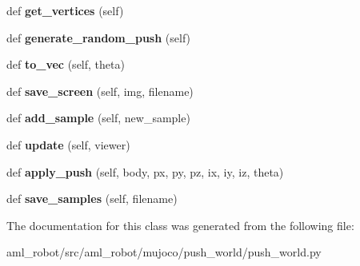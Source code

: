 \begin{DoxyCompactItemize}
\item 
\hypertarget{classaml__robot_1_1mujoco_1_1push__world_1_1push__world_1_1_push_world_a9d1907c397604e25f01a72e91374a715}{}\label{classaml__robot_1_1mujoco_1_1push__world_1_1push__world_1_1_push_world_a9d1907c397604e25f01a72e91374a715} 
def {\bfseries get\+\_\+vertices} (self)
\item 
\hypertarget{classaml__robot_1_1mujoco_1_1push__world_1_1push__world_1_1_push_world_a453d33c0a1a8067c683d747e87e995ab}{}\label{classaml__robot_1_1mujoco_1_1push__world_1_1push__world_1_1_push_world_a453d33c0a1a8067c683d747e87e995ab} 
def {\bfseries generate\+\_\+random\+\_\+push} (self)
\item 
\hypertarget{classaml__robot_1_1mujoco_1_1push__world_1_1push__world_1_1_push_world_aff175795ad0dc158872167fdc5af7859}{}\label{classaml__robot_1_1mujoco_1_1push__world_1_1push__world_1_1_push_world_aff175795ad0dc158872167fdc5af7859} 
def {\bfseries to\+\_\+vec} (self, theta)
\item 
\hypertarget{classaml__robot_1_1mujoco_1_1push__world_1_1push__world_1_1_push_world_a37092dc3946f924987fcdf69c3407cab}{}\label{classaml__robot_1_1mujoco_1_1push__world_1_1push__world_1_1_push_world_a37092dc3946f924987fcdf69c3407cab} 
def {\bfseries save\+\_\+screen} (self, img, filename)
\item 
\hypertarget{classaml__robot_1_1mujoco_1_1push__world_1_1push__world_1_1_push_world_afec1754d0b300d5a49a390e5db0d1c57}{}\label{classaml__robot_1_1mujoco_1_1push__world_1_1push__world_1_1_push_world_afec1754d0b300d5a49a390e5db0d1c57} 
def {\bfseries add\+\_\+sample} (self, new\+\_\+sample)
\item 
\hypertarget{classaml__robot_1_1mujoco_1_1push__world_1_1push__world_1_1_push_world_a099e61d2e32c0ab81411a74c6c58ffc2}{}\label{classaml__robot_1_1mujoco_1_1push__world_1_1push__world_1_1_push_world_a099e61d2e32c0ab81411a74c6c58ffc2} 
def {\bfseries update} (self, viewer)
\item 
\hypertarget{classaml__robot_1_1mujoco_1_1push__world_1_1push__world_1_1_push_world_a93cdfa63801b27d37a4272ef30f0f4bd}{}\label{classaml__robot_1_1mujoco_1_1push__world_1_1push__world_1_1_push_world_a93cdfa63801b27d37a4272ef30f0f4bd} 
def {\bfseries apply\+\_\+push} (self, body, px, py, pz, ix, iy, iz, theta)
\item 
\hypertarget{classaml__robot_1_1mujoco_1_1push__world_1_1push__world_1_1_push_world_a8f7c2db3f85a33bd79507417fac422d3}{}\label{classaml__robot_1_1mujoco_1_1push__world_1_1push__world_1_1_push_world_a8f7c2db3f85a33bd79507417fac422d3} 
def {\bfseries save\+\_\+samples} (self, filename)
\end{DoxyCompactItemize}


The documentation for this class was generated from the following file\+:\begin{DoxyCompactItemize}
\item 
aml\+\_\+robot/src/aml\+\_\+robot/mujoco/push\+\_\+world/push\+\_\+world.\+py\end{DoxyCompactItemize}
